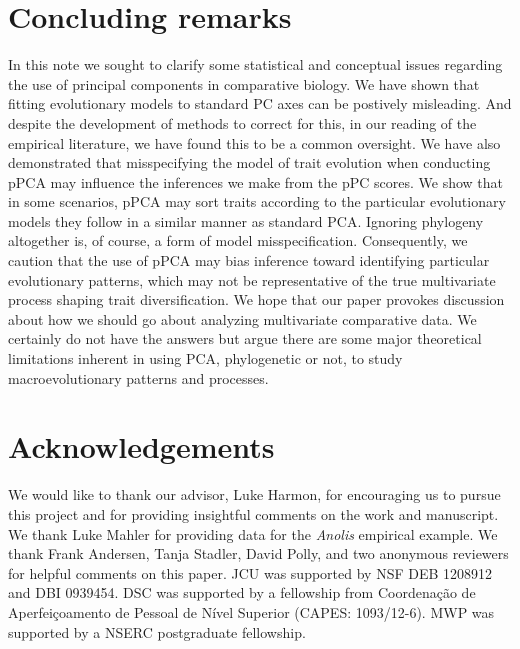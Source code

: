 \documentclass[a4paper,11pt]{article}
\begin{document}
\section{Concluding remarks}
In this note we sought to clarify some statistical and conceptual issues regarding the use of principal components in comparative biology. We have shown that fitting evolutionary models to standard PC axes can be postively misleading. And despite the development of methods to correct for this, in our reading of the empirical literature, we have found this to be a common oversight. We have also demonstrated that misspecifying the model of trait evolution when conducting pPCA may influence the inferences we make from the pPC scores. We show that in some scenarios, pPCA may sort traits according to the particular evolutionary models they follow in a similar manner as standard PCA. Ignoring phylogeny altogether is, of course, a form of model misspecification. Consequently, we caution that the use of pPCA may bias inference toward identifying particular evolutionary patterns, which may not be representative of the true multivariate process shaping trait diversification. We hope that our paper provokes discussion about how we should go about analyzing multivariate comparative data. We certainly do not have the answers but argue there are some major theoretical limitations inherent in using PCA, phylogenetic or not, to study macroevolutionary patterns and processes.

\section{Acknowledgements}

We would like to thank our advisor, Luke Harmon, for encouraging us to pursue this project and for providing insightful comments on the work and manuscript. We thank Luke Mahler for providing data for the \textit{Anolis} empirical example. We thank Frank Andersen, Tanja Stadler, David Polly, and two anonymous reviewers for helpful comments on this paper. JCU was supported by NSF DEB 1208912 and DBI 0939454. DSC was supported by a fellowship from Coordena\c{c}\~{a}o de Aperfei\c{c}oamento de Pessoal de N\'{i}vel Superior (CAPES: 1093/12-6). MWP was supported by a NSERC postgraduate fellowship. 

\newpage


\end{document}
